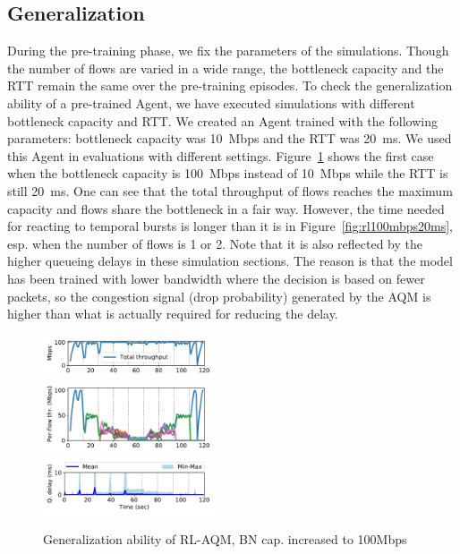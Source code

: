 \documentclass[conference]{IEEEtran}
\begin{document}
\subsection{Generalization}
During the pre-training phase, we fix the parameters of the simulations. Though the number of flows are varied in a wide range, the bottleneck capacity and the RTT remain the same over the pre-training episodes. To check the generalization ability of a pre-trained Agent, we have executed simulations with different bottleneck capacity and RTT. 
We created an Agent trained with the following parameters:  bottleneck capacity was 10~Mbps and the RTT was 20~ms. We used this Agent in evaluations with different settings. Figure~\ref{fig:rl_tr10_100mbps20ms} shows the first case when the bottleneck capacity is 100~Mbps instead of 10~Mbps while the RTT is still 20~ms. One can see that the total throughput of flows reaches the maximum capacity and flows share the bottleneck in a fair way. However, the time needed for reacting to temporal bursts is longer than it is in Figure~\ref{fig:rl100mbps20ms}, esp. when the number of flows is 1 or 2. Note that it is also reflected by the higher queueing delays in these simulation sections. The reason is that the model has been trained with lower bandwidth where the decision is based on fewer packets, so the congestion signal (drop probability) generated by the AQM is higher than what is actually required for reducing the delay.


\begin{figure}[t]
\begin{center}
\includegraphics[width=0.45\textwidth]{Figures/rl_tr10mbps-100mbps_10ms_total.pdf} \\
\includegraphics[width=0.45\textwidth]{Figures/rl_tr10mbps-100mbps_10ms_flow.pdf} \\
\includegraphics[width=0.45\textwidth]{Figures/rl_tr10mbps-100mbps_10ms_delay.pdf}
\end{center}
\caption{Generalization ability of RL-AQM, BN cap. increased to 100Mbps}
\label{fig:rl_tr10_100mbps20ms}
\end{figure}
\end{document}
